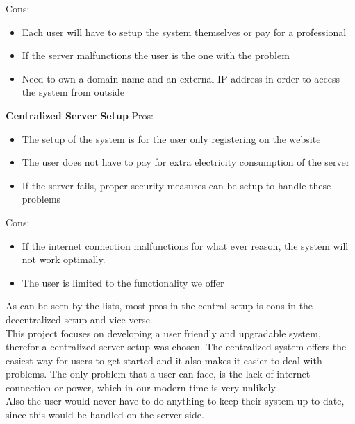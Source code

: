 Cons:
\begin{itemize}
	\item Each user will have to setup the system themselves or pay for a professional
  \item If the server malfunctions the user is the one with the problem
  \item Need to own a domain name and an external IP address in order to access the system from outside
\end{itemize}

\textbf{Centralized Server Setup}
Pros:
\begin{itemize}
	\item The setup of the system is for the user only registering on the website
	\item The user does not have to pay for extra electricity consumption of the server
	\item If the server fails, proper security measures can be setup to handle these problems
\end{itemize}

Cons:
\begin{itemize}
	\item If the internet connection malfunctions for what ever reason, the system will not work optimally.
  \item The user is limited to the functionality we offer
\end{itemize}

As can be seen by the lists, most pros in the central setup is cons in the decentralized setup and vice verse.\\
This project focuses on developing a user friendly and upgradable system, therefor a centralized server setup was chosen. The centralized system offers the easiest way for users to get started and it also makes it easier to deal with problems. The only problem that a user can face, is the lack of internet connection or power, which in our modern time is very unlikely.\\
Also the user would never have to do anything to keep their system up to date, since this would be handled on the server side.